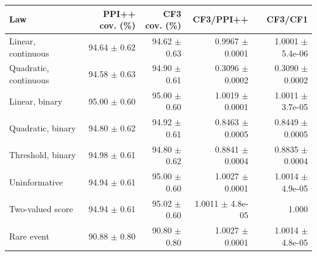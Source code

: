 \small
\begin{tabular}{lrrrr}
\toprule
Law & PPI++ cov. (\%) & CF3 cov. (\%) & CF3/PPI++ & CF3/CF1 \\
\midrule
Linear, continuous & 94.64 $\pm$ 0.62 & 94.62 $\pm$ 0.63 & 0.9967 $\pm$ 0.0001 & 1.0001 $\pm$ 5.4e-06 \\
Quadratic, continuous & 94.58 $\pm$ 0.63 & 94.90 $\pm$ 0.61 & 0.3096 $\pm$ 0.0002 & 0.3090 $\pm$ 0.0002 \\
Linear, binary & 95.00 $\pm$ 0.60 & 95.00 $\pm$ 0.60 & 1.0019 $\pm$ 0.0001 & 1.0011 $\pm$ 3.7e-05 \\
Quadratic, binary & 94.80 $\pm$ 0.62 & 94.92 $\pm$ 0.61 & 0.8463 $\pm$ 0.0005 & 0.8449 $\pm$ 0.0005 \\
Threshold, binary & 94.98 $\pm$ 0.61 & 94.80 $\pm$ 0.62 & 0.8841 $\pm$ 0.0004 & 0.8835 $\pm$ 0.0004 \\
Uninformative & 94.94 $\pm$ 0.61 & 95.00 $\pm$ 0.60 & 1.0027 $\pm$ 0.0001 & 1.0014 $\pm$ 4.9e-05 \\
Two-valued score & 94.94 $\pm$ 0.61 & 95.02 $\pm$ 0.60 & 1.0011 $\pm$ 4.8e-05 & 1.000 \\
Rare event & 90.88 $\pm$ 0.80 & 90.80 $\pm$ 0.80 & 1.0027 $\pm$ 0.0001 & 1.0014 $\pm$ 4.8e-05 \\
\bottomrule
\end{tabular}
